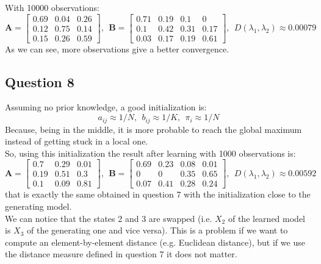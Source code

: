 \documentclass{scrartcl}
\begin{document}
With 10000 observations:
\begin{equation}
 \mathbf{A} = 
 \begin{bmatrix}
  0.69 & 0.04 & 0.26 \\
  0.12 & 0.75 & 0.14 \\
  0.15 & 0.26 & 0.59
 \end{bmatrix}
 ,\ \ \mathbf{B} = 
 \begin{bmatrix}
  0.71 & 0.19 & 0.1 & 0 \\
  0.1 & 0.42 & 0.31 & 0.17 \\
  0.03 & 0.17 & 0.19 & 0.61
 \end{bmatrix}
 ,\ \ D(\lambda_1, \lambda_2) \approx 0.00079
\end{equation}
As we can see, more observations give a better convergence.

\subsection{Question 8}

Assuming no prior knowledge, a good initialization is:
\begin{equation}
 a_{ij} \approx 1/N,\ \ b_{ij} \approx 1/K,\ \ \pi_i \approx 1/N
\end{equation}
Because, being in the middle, it is more probable to reach the global maximum instead of getting stuck in a local one. \\

So, using this initialization the result after learning with 1000 observations is:
\begin{equation}
  \mathbf{A} = 
 \begin{bmatrix}
  0.7 & 0.29 & 0.01 \\
  0.19 & 0.51 & 0.3 \\
  0.1 & 0.09 & 0.81
 \end{bmatrix} 
 ,\ \ \mathbf{B} = 
 \begin{bmatrix}
  0.69 & 0.23 & 0.08 & 0.01 \\
  0 & 0 & 0.35 & 0.65 \\
  0.07 & 0.41 & 0.28 & 0.24
 \end{bmatrix} 
 ,\ \ D(\lambda_1, \lambda_2) \approx 0.00592
\end{equation}
that is exactly the same obtained in question 7 with the initialization close to the generating model. \\

We can notice that the states 2 and 3 are swapped (i.e. $X_2$ of the learned model is $X_3$ of the generating one and vice versa). This is a problem if we want to compute an element-by-element distance (e.g. Euclidean distance), but if we use the distance measure defined in question 7 it does not matter.
\end{document}
